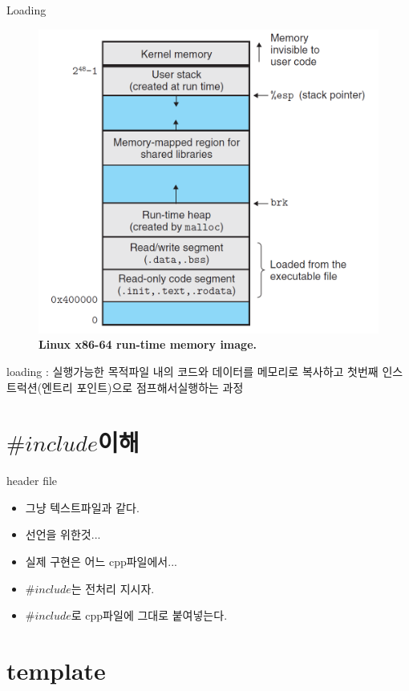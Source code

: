 \documentclass[10pt]{beamer}
\begin{document}
\begin{frame}{Loading}    
    \begin{figure}[h!]
        \centering
        \includegraphics[scale=0.3]{pic5}
        \caption{\textbf{Linux x86-64 run-time memory image.}}
    \end{figure}
    loading : 실행가능한 목적파일 내의 코드와 데이터를 메모리로 복사하고 첫번째 인스트럭션(엔트리 포인트)으로 점프해서실행하는 과정
\end{frame}    

\section{$\#include$이해}

\begin{frame}[fragile]{header file}
    \begin{itemize}
        \item 그냥 텍스트파일과 같다.
        \item 선언을 위한것...
        \item 실제 구현은 어느 cpp파일에서...
        \item $\#include$는 전처리 지시자.
        \item $\#include$로 cpp파일에 그대로 붙여넣는다.
    \end{itemize}
\end{frame}

\section{template}
\end{document}
